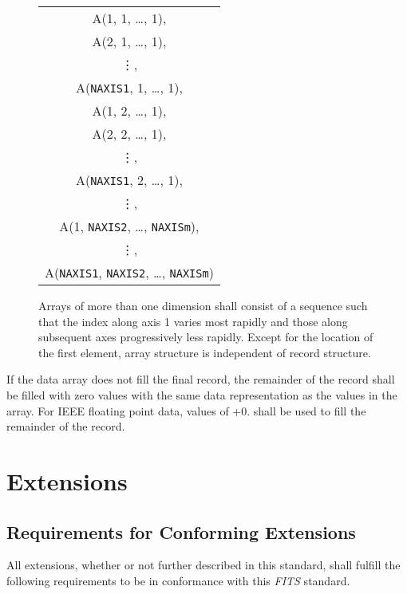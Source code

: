 \begin{figure}[t]
\begin{center}
\begin{tabular}{c} \\
          A(1, 1, \ldots, 1), \\ 
          A(2, 1, \ldots, 1), \\ 
          \vdots, \\ 
          A({\tt NAXIS1}, 1, \ldots, 1), \\
          A(1, 2, \ldots, 1), \\ 
          A(2, 2, \ldots, 1), \\ 
          \vdots, \\ 
          A({\tt NAXIS1}, 2, \ldots, 1), \\
          \vdots,          \\ 
          A(1, {\tt NAXIS2}, \ldots, {\tt NAXISm}), \\  
          \vdots,  \\ 
          A({\tt NAXIS1}, {\tt NAXIS2}, \ldots, {\tt NAXISm}) \\
\end{tabular}

\caption[Array data sequence]
   {Arrays of more than one dimension shall consist of a sequence 
   such that the index along axis 1 varies most rapidly and 
   those along subsequent axes progressively less rapidly. Except 
   for the
   location of the first element, array structure is independent of 
   record structure.}
\label{f:array}
\end{center}
\end{figure}
   If the data array does not fill the final record, the
   remainder of the record shall be filled with zero values with
   the same data representation as the values in the array. For IEEE
   floating point data, 
   values of +0. shall
   be used to fill the remainder of the record. 
   
  
  \section{Extensions}
  
   \subsection{Requirements for Conforming Extensions}
    \label{s:genext}  
   All extensions, 
   whether or not further described in this standard, shall
   fulfill the following requirements to be in conformance with
   this {\em FITS\/} standard.

